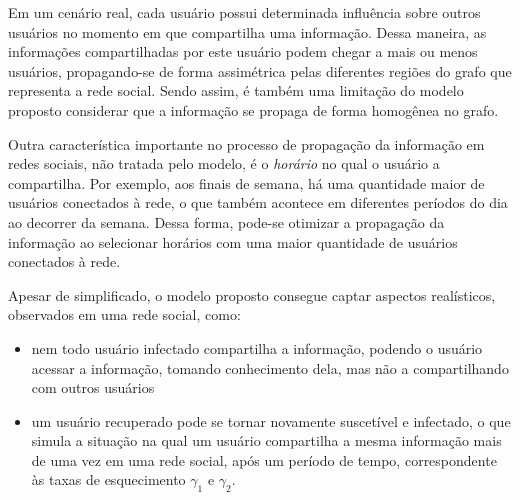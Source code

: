 \documentclass[
	12pt,				%
	openright,			%
	oneside,			%
	a4paper,			%
	english,			%
	french,				%
	spanish,			%
	brazil				%
	]{abntex2}
\begin{document}
Em um cenário real, cada usuário possui determinada influência sobre
outros usuários no momento em que compartilha uma informação.  Dessa
maneira, as informações compartilhadas por este usuário podem chegar a
mais ou menos usuários, propagando-se de forma assimétrica pelas
diferentes regiões do grafo que representa a rede social.  Sendo
assim, é também uma limitação do modelo proposto considerar que a
informação se propaga de forma homogênea no grafo.

Outra característica importante no processo de propagação da
informação em redes sociais, não tratada pelo modelo, é o
\emph{horário} no qual o usuário a compartilha.  Por exemplo, aos
finais de semana, há uma quantidade maior de usuários conectados à
rede, o que também acontece em diferentes períodos do dia ao decorrer
da semana.  Dessa forma, pode-se otimizar a propagação da informação
ao selecionar horários com uma maior quantidade de usuários conectados
à rede.

Apesar de simplificado, o modelo proposto consegue captar
aspectos realísticos, observados em uma rede social, como:

\begin{itemize}
\item nem todo usuário infectado compartilha a informação, podendo o
  usuário acessar a informação, tomando conhecimento dela, mas não
  a compartilhando com outros usuários
\item um usuário recuperado pode se tornar novamente suscetível e
  infectado, o que simula a situação na qual um usuário compartilha a
  mesma informação mais de uma vez em uma rede social, após um período
  de tempo, correspondente às taxas de esquecimento $\gamma_1$ e
  $\gamma_2$.
\end{itemize}


\postextual


\end{document}
